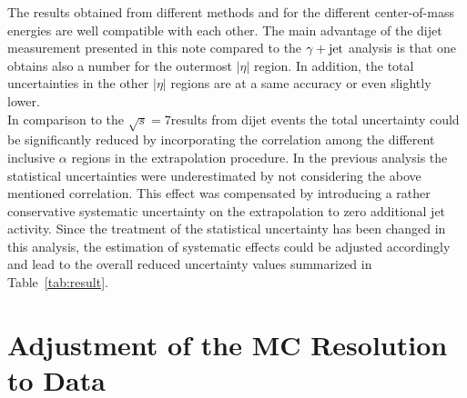 The results obtained from different methods and for the different center-of-mass energies are well compatible with each other. The main advantage of the dijet measurement presented in this note compared to the $\gamma +\rm{jet}$ analysis is that one obtains also a number for the outermost $|\eta|$ region. In addition, the total uncertainties in the other $|\eta|$ regions are at a same accuracy or even slightly lower. \\
In comparison to the $\sqrt{s}=7$\tev results from dijet events the total uncertainty could be significantly reduced by incorporating the correlation among the different inclusive $\alpha$ regions in the extrapolation procedure. In the previous analysis the statistical uncertainties were underestimated by not considering the above mentioned correlation. This effect was compensated by introducing a rather conservative systematic uncertainty on the extrapolation to zero additional jet activity. Since the treatment of the statistical uncertainty has been changed in this analysis, the estimation of systematic effects could be adjusted accordingly and lead to the overall reduced uncertainty values summarized in Table~\ref{tab:result}.

\section{Adjustment of the MC Resolution to Data}
\label{sec:jer_adjustment}












